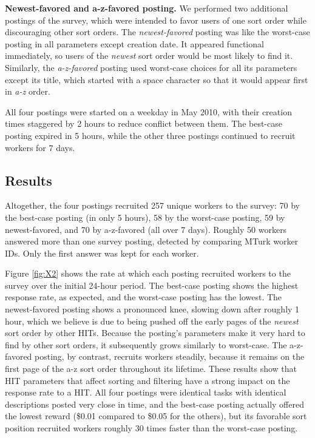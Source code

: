 \documentclass{sig-alternate}
\begin{document}
{\bf Newest-favored and a-z-favored posting.} We performed two
additional postings of the survey, which were intended to favor users
of one sort order while discouraging other sort orders.  The {\em
  newest-favored} posting was like the worst-case posting in all
parameters except creation date.  It appeared functional immediately,
so users of the {\em newest} sort order would be most likely to find
it.  Similarly, the {\em a-z-favored} posting used worst-case choices
for all its parameters except its title, which started with a space
character so that it would appear first in {\em a-z} order.

All four postings were started on a weekday in May 2010, with their
creation times staggered by 2 hours to reduce conflict between them.
The best-case posting expired in 5 hours, while the other three
postings continued to recruit workers for 7 days.

\subsection{Results}
Altogether, the four postings recruited 257 unique workers to the
survey: 70 by the best-case posting (in only 5 hours), 58 by the
worst-case posting, 59 by newest-favored, and 70 by a-z-favored (all
over 7 days).  Roughly 50 workers answered more than one survey
posting, detected by comparing MTurk worker IDs. Only the first answer
was kept for each worker.

Figure \ref{fig:X2} shows the rate at which each posting recruited
workers to the survey over the initial 24-hour period.  The best-case
posting shows the highest response rate, as expected, and the
worst-case posting has the lowest.  The newest-favored posting shows a
pronounced knee, slowing down after roughly 1 hour, which we believe
is due to being pushed off the early pages of the {\em newest} sort
order by other HITs.  Because the posting's parameters make it very
hard to find by other sort orders, it subsequently grows similarly to
worst-case.  The a-z-favored posting, by contrast, recruits workers
steadily, because it remains on the first page of the a-z sort order
throughout its lifetime.  These results show that HIT parameters that
affect sorting and filtering have a strong impact on the response rate
to a HIT.  All four postings were
identical tasks with identical descriptions posted very close in time, and the best-case posting
actually offered the lowest reward (\$0.01 compared to \$0.05 for the
others), but its favorable sort position recruited workers roughly 30
times faster than the worst-case posting.
\end{document}
